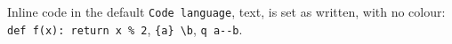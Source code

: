 Inline code in the default \texttt{Code language}, text, is set as written, with no
colour: \texttt{def f(x): return x \% 2}, \texttt{\{a\} \textbackslash{}b}, \texttt{\textquotesingle{}q\textquotesingle{} a-\/-b}.

